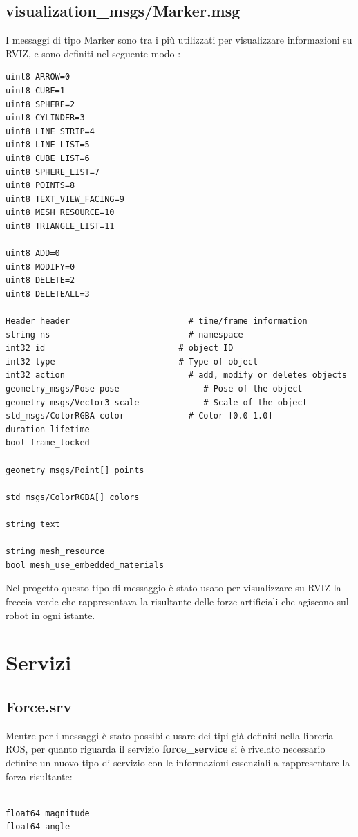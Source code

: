 \documentclass[Lau, binding=0.6cm, oneside]{sapthesis}
\begin{document}
\subsection{visualization\_msgs/Marker.msg}
I messaggi di tipo Marker sono tra i più utilizzati per visualizzare informazioni su RVIZ, e sono definiti nel seguente modo \cite{fonte7}:
\begin{lstlisting}
uint8 ARROW=0
uint8 CUBE=1
uint8 SPHERE=2
uint8 CYLINDER=3
uint8 LINE_STRIP=4
uint8 LINE_LIST=5
uint8 CUBE_LIST=6
uint8 SPHERE_LIST=7
uint8 POINTS=8
uint8 TEXT_VIEW_FACING=9
uint8 MESH_RESOURCE=10
uint8 TRIANGLE_LIST=11

uint8 ADD=0
uint8 MODIFY=0
uint8 DELETE=2
uint8 DELETEALL=3

Header header                        # time/frame information
string ns                            # namespace
int32 id                           # object ID
int32 type                         # Type of object
int32 action                         # add, modify or deletes objects
geometry_msgs/Pose pose                 # Pose of the object
geometry_msgs/Vector3 scale             # Scale of the object
std_msgs/ColorRGBA color             # Color [0.0-1.0]
duration lifetime
bool frame_locked

geometry_msgs/Point[] points

std_msgs/ColorRGBA[] colors

string text

string mesh_resource
bool mesh_use_embedded_materials
\end{lstlisting}	

Nel progetto questo tipo di messaggio è stato usato per visualizzare su RVIZ la freccia verde che rappresentava la risultante delle forze artificiali che agiscono sul robot in ogni istante.

\section{Servizi}
\subsection{Force.srv}
Mentre per i messaggi è stato possibile usare dei tipi già definiti nella libreria ROS, per quanto riguarda il servizio \textbf{force\_service} si è rivelato necessario definire un nuovo tipo di servizio con le informazioni essenziali a rappresentare la forza risultante:

\begin{lstlisting}
---
float64 magnitude
float64 angle
\end{lstlisting}
\end{document}
